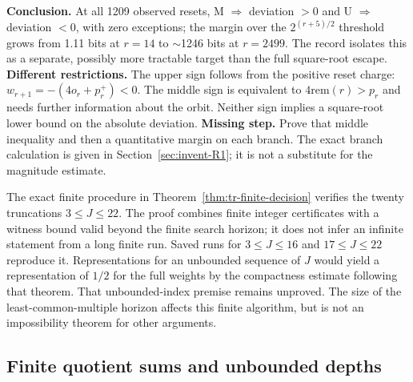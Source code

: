 \begin{obs}
\textbf{Conclusion.} At all 1209 observed resets, M $\Rightarrow$ deviation $>0$ and U $\Rightarrow$
deviation $<0$, with zero exceptions; the margin over the $2^{(r+5)/2}$ threshold grows from
1.11 bits at $r=14$ to $\sim$1246 bits at $r=2499$. The record isolates this as a separate,
possibly more tractable target than the full square-root escape.
\textbf{Different restrictions.} The upper sign follows from the
positive reset charge: $w_{r+1}=-(4o_r+p_r^+)<0$.
The middle sign is equivalent to $4\mathrm{rem}(r)>p_r$ and needs
further information about the orbit.  Neither sign implies a
square-root lower bound on the absolute deviation.
\textbf{Missing step.} Prove that middle inequality and then a
quantitative margin on each branch.  The exact branch calculation
is given in Section~\ref{sec:invent-R1}; it is not a substitute for
the magnitude estimate.
\end{obs}

\begin{obs}
The exact finite procedure in
Theorem~\ref{thm:tr-finite-decision} verifies the twenty truncations
$3\le J\le22$.  The proof combines finite integer certificates with a
witness bound valid beyond the finite search horizon; it does not infer
an infinite statement from a long finite run.  Saved runs for
\href{https://github.com/wcook04/plectis-erdos/blob/f757115e03bebe5c04431a147da559015c680a37/research/experiments/erdos257/receipts/truncation-ladder-3-16.json}{$3\le J\le16$} and
\href{https://github.com/wcook04/plectis-erdos/blob/f757115e03bebe5c04431a147da559015c680a37/research/experiments/erdos257/receipts/truncation-ladder-17-22.json}{$17\le J\le22$} reproduce it.
Representations for an unbounded sequence of $J$ would yield a
representation of $1/2$ for the full weights by the compactness estimate
following that theorem.  That unbounded-index premise remains unproved.
The size of the least-common-multiple horizon affects this finite
algorithm, but is not an impossibility theorem for other arguments.
\end{obs}

\subsection{Finite quotient sums and unbounded depths}


